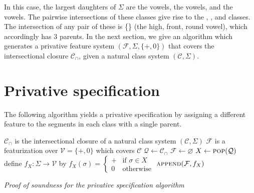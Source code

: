 \documentclass[11pt, oneside]{article}   	%
\begin{document}
In this case, the largest daughters of $\Sigma$ are the  vowels, the  vowels, and the  vowels. The pairwise intersections of these classes give rise to the , , and  classes. The intersection of any pair of these is \{\} (the high, front, round vowel), which accordingly has 3 parents. In the next section, we give an algorithm which generates a privative feature system $(\mathcal F, \Sigma, \{+, 0\})$ that covers the intersectional closure $\mathcal C_\cap$, given a natural class system $(\mathcal C, \Sigma)$.

 \section{Privative specification}

The following algorithm yields a privative specification by assigning a different feature  to the segments in each class with a single parent.
 
\noindent \begin{algorithmic}
    \REQUIRE $\mathcal C_\cap$ is the intersectional closure of a natural class system $(\mathcal C, \Sigma)$
    \ENSURE $\mathcal F$ is a featurization over $\mathcal V = \{ +, 0 \}$ which covers $\mathcal C$
    \STATE
    \STATE $\mathcal Q \leftarrow \mathcal C_\cap$
    \STATE $\mathcal F \leftarrow \varnothing$
    \STATE
        \STATE $X \leftarrow \textsc{pop}(\mathcal Q)$
            \STATE define $f_X : \Sigma \rightarrow \mathcal V$ by $f_X(\sigma) = \begin{cases}
                + & \mbox{if } \sigma \in X \\
                0 & \mbox{otherwise}
                \end{cases} $
            \STATE $\textsc{append}(\mathcal F, f_X)$
        \ENDIF
    \ENDWHILE
\end{algorithmic}

\vspace{\baselineskip} \noindent \textit{Proof of soundness for the privative specification algorithm}
\end{document}
